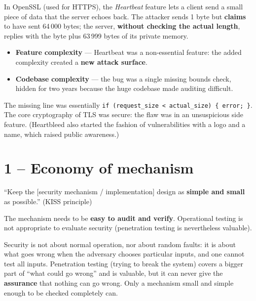 \begin{exbox}[title=Heartbleed (CVE-2014-0160) --- why simplicity matters]
In OpenSSL (used for HTTPS), the \textit{Heartbeat} feature lets a client send a small
piece of data that the server echoes back. The attacker sends 1 byte but
\textbf{claims} to have sent 64\,000 bytes; the server, \textbf{without checking the
actual length}, replies with the byte plus 63\,999 bytes of its private memory.
\begin{itemize}
  \item \textbf{Feature complexity} --- Heartbeat was a non-essential feature: the
        added complexity created a \textbf{new attack surface}.
  \item \textbf{Codebase complexity} --- the bug was a single missing bounds check,
        hidden for two years because the huge codebase made auditing difficult.
\end{itemize}

The missing line was essentially \texttt{if (request\_size < actual\_size) \{ error; \}}. The
core cryptography of TLS was secure: the flaw was in an unsuspicious side feature. (Heartbleed
also started the fashion of vulnerabilities with a logo and a name, which raised public
awareness.)
\end{exbox}

\section{1 -- Economy of mechanism}

\begin{defnbox}[title=Economy of mechanism]
``Keep the [security mechanism / implementation] design as \textbf{simple and small}
as possible.'' (KISS principle)
\end{defnbox}

\begin{rembox}[title=Why?]
The mechanism needs to be \textbf{easy to audit and verify}. Operational testing is not
appropriate to evaluate security (penetration testing is nevertheless valuable).
\end{rembox}

\begin{rembox}[title={Why testing is not enough}]
Security is not about normal operation, nor about random faults: it is about what goes wrong when
the adversary chooses particular inputs, and one cannot test all inputs. Penetration testing
(trying to break the system) covers a bigger part of ``what could go wrong'' and is valuable, but
it can never give the \textbf{assurance} that nothing can go wrong. Only a mechanism small and
simple enough to be checked completely can.
\end{rembox}

